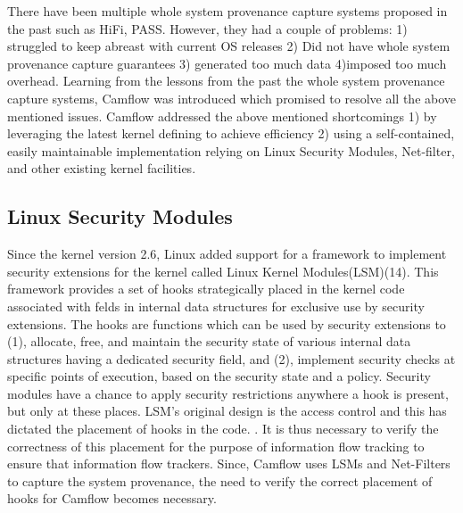 \label{A small recap into data provenance and whole system provenance capture}

There have been multiple whole system provenance capture systems proposed in the past such as HiFi, PASS. However, they had a couple of problems: 1) struggled to keep abreast with current OS releases 2) Did not have whole system provenance capture guarantees 3) generated too much data 4)imposed too much overhead. Learning from the lessons from the past the whole system provenance capture systems, Camflow was introduced which promised to resolve all the above mentioned issues. Camflow addressed the above mentioned shortcomings 1) by leveraging the latest kernel defining to achieve efficiency 2) using a self-contained, easily maintainable implementation relying on Linux Security Modules, Net-filter, and other existing kernel facilities.


\subsection{Linux Security Modules}
\label{LSMs}
Since the kernel version 2.6, Linux added support for a framework to implement security extensions for the kernel called Linux Kernel Modules(LSM)(14). This framework provides a set of hooks strategically
placed in the kernel code associated with felds in internal data
structures for exclusive use by security extensions. The hooks are
functions which can be used by security extensions to (1), allocate,
free, and maintain the security state of various internal data structures having a dedicated security field, and (2), implement security
checks at specific points of execution, based on the security state
and a policy.  Security modules have a chance to apply security
restrictions anywhere a hook is present, but only at these places.
LSM’s original design is the access control and this has dictated the
placement of hooks in the code. . It is thus necessary to verify the
correctness of this placement for the purpose of information flow
tracking to ensure that information flow trackers. 
\vskip 0.2in
Since, Camflow uses LSMs and Net-Filters to capture the system provenance, the need to verify the correct placement of hooks for Camflow becomes necessary. 



